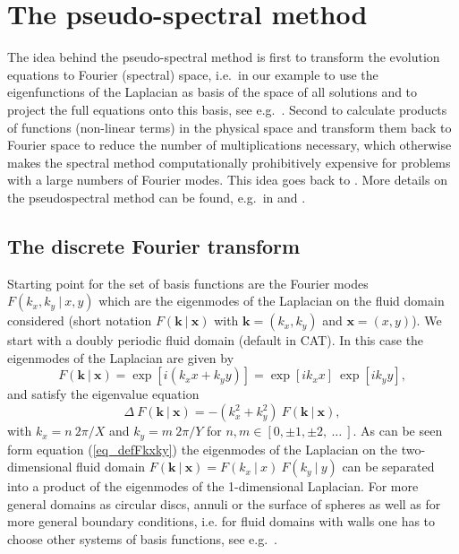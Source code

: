 \chapter{The pseudo-spectral method} \label{sec_pseudspec}
The idea behind the pseudo-spectral method is first to transform
the evolution equations to Fourier (spectral) space, i.e.\ in our
example to use the eigenfunctions of the Laplacian as basis of the
space of all solutions and to project the full equations onto this basis,
see e.g.\ \cite{canutoetal1988}. Second to calculate products of functions
(non-linear terms) in the physical space and transform them back
to Fourier space to reduce the number of multiplications necessary,
which otherwise makes the spectral method computationally prohibitively
expensive for problems with a large numbers of Fourier modes. This idea
goes back to \cite{kreissandoliger1972}. More details on the
pseudospectral method can be found, e.g.\ in \cite{orszag1972}
and \cite{fornberg1987}.
%
\section{The discrete Fourier transform}
%
\label{ssec_evolfourier}
Starting point for the set of basis functions are the Fourier modes 
$F(k_{x},k_{y} \ | \ x,y)$ which are the eigenmodes of the Laplacian 
on the fluid domain considered (short notation 
$F(\mathbf{k} \ | \ \mathbf{x})$ with 
$\mathbf{k} = (k_{x},k_{y})$ and $\mathbf{x} = (x,y)$).  
We start with a doubly periodic fluid domain (default in CAT). 
In this case the eigenmodes of the Laplacian are given by
\begin{equation} \label{eq_defFkxky}
  F(\mathbf{k} \ | \ \mathbf{x}) 
   = 
 \exp \left[ i  \left(k_{x} x + k_{y} y \right) \right]
   = 
 \exp \left[ i k_{x} x \right] \ 
 \exp \left[ i k_{y} y \right],
\end{equation}
and satisfy the eigenvalue equation
\begin{equation} \label{eq_eigFkxky}
 \Delta \ F(\mathbf{k} \ | \ \mathbf{x})
   =
  - \left( k_{x}^{2} + k_{y}^{2} \right) \ 
    F(\mathbf{k} \ | \ \mathbf{x}),
\end{equation}
with $k_{x} = n \ 2 \pi/X$ and $k_{y} = m \ 2 \pi/Y$ for 
$n,m \in [0,\pm 1, \pm 2,\ \dots \ ]$. As can be seen form equation 
(\ref{eq_defFkxky}) the eigenmodes of the Laplacian on the 
two-dimensional fluid domain 
$F(\mathbf{k} \ | \ \mathbf{x}) = F(k_{x} \ | \ x) \ F(k_{y} \ | \ y)$
can be separated into a product of the eigenmodes of the 
1-dimensional Laplacian. For more general domains
as circular discs, annuli or the surface of spheres as well as 
for more general boundary conditions, i.e. for fluid domains with walls 
one has to choose other systems of basis functions, 
see e.g.\ \cite{canutoetal1988}.

